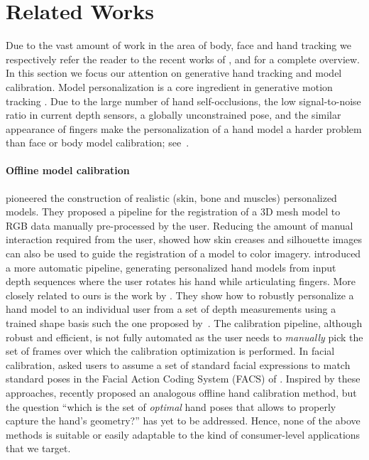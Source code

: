 \section{Related Works}
Due to the vast amount of work in the area of body, face and hand tracking we respectively refer the reader to the recent works of ,  and  for a complete overview. In this section we focus our attention on generative hand tracking and model calibration. Model personalization is a core ingredient in generative motion tracking \cite{pons2011model}.  Due to the large number of hand self-occlusions, the low signal-to-noise ratio in current depth sensors, a globally unconstrained pose, and the similar appearance of fingers make the personalization of a hand model a harder problem than face or body model calibration; see~\cite{supancic2015depth}.

\paragraph{Offline model calibration}
 pioneered the construction of realistic (skin, bone and muscles) personalized models. They proposed a pipeline for the registration of a 3D mesh model to RGB data manually pre-processed by the user. Reducing the amount of manual interaction required from the user,  showed how skin creases and silhouette images can also be used to guide the registration of a model to color imagery.  introduced a more automatic pipeline, generating personalized hand models from input depth sequences where the user rotates his hand while articulating fingers. More closely related to ours is the work by . They show how to robustly personalize a hand model to an individual user from a set of depth measurements using a trained shape basis such the one proposed by~. The calibration pipeline, although robust and efficient, is not fully automated as the user needs to \emph{manually} pick the set of frames over which the calibration optimization is performed. 
In facial calibration,  asked users to assume a set of standard facial expressions to match standard poses in the Facial Action Coding System (FACS) of .
Inspired by these approaches,  recently proposed an analogous offline hand calibration method, but the question ``which is the set of \emph{optimal} hand poses that allows to properly capture the hand's geometry?'' has yet to be addressed. Hence, none of the above methods is suitable or easily adaptable to the kind of consumer-level applications that we target.

